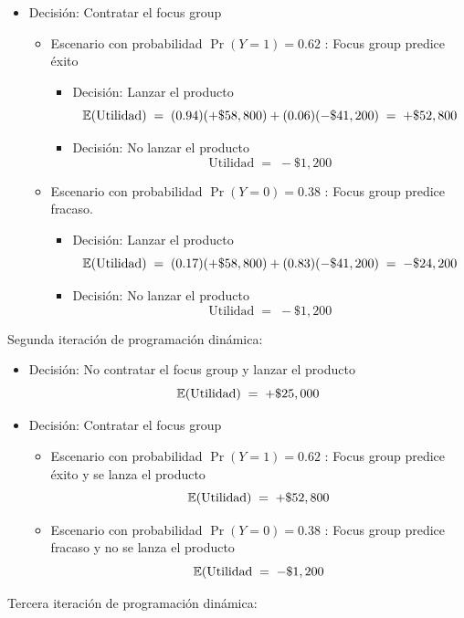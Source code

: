 \documentclass[ a4paper, twoside, 11pt]{article}
\begin{document}
\begin{problem}
\begin{itemize}
\item Decisi\'on: Contratar el focus group
\begin{itemize}

\item Escenario con probabilidad $\Pr(Y=1) = 0.62$ : Focus group predice \'exito
\begin{itemize}
\item Decisi\'on: Lanzar el producto
\[
\mathbb{E}(\text{Utilidad}) \; = \;
(0.94)(+\$58,800) + (0.06)(-\$41,200) \; = \; +\$52,800
\]
\item Decisi\'on: No lanzar el producto
\[
\text{Utilidad} \; = \; -\$1,200
\]
\end{itemize}

\item Escenario con probabilidad $\Pr(Y=0) = 0.38$ : Focus group predice fracaso.
\begin{itemize}
\item Decisi\'on: Lanzar el producto
\[
\mathbb{E}(\text{Utilidad}) \; = \;
(0.17)(+\$58,800) + (0.83)(-\$41,200) \; = \; -\$24,200
\]
\item Decisi\'on: No lanzar el producto
\[
\text{Utilidad} \; = \; -\$1,200
\]
\end{itemize}
\end{itemize}

\end{itemize}

Segunda iteraci\'on de programaci\'on din\'amica: 
\begin{itemize}

\item Decisi\'on: No contratar el focus group y lanzar el producto
\[
\mathbb{E}(\text{Utilidad}) \; = \; +\$25,000
\]

\item Decisi\'on: Contratar el focus group
\begin{itemize}
\item Escenario con probabilidad $\Pr(Y=1) = 0.62$ : Focus group predice \'exito y se lanza el producto
\[
\mathbb{E}(\text{Utilidad}) \; = \; +\$52,800
\]
\item Escenario con probabilidad $\Pr(Y=0) = 0.38$ : Focus group predice fracaso y no se lanza el producto
\[
\mathbb{E}(
\text{Utilidad} \; = \; -\$1,200
\]
\end{itemize}

\end{itemize}

Tercera iteraci\'on de programaci\'on din\'amica: 
\begin{itemize}


\end{itemize}
\end{problem}
\end{document}
